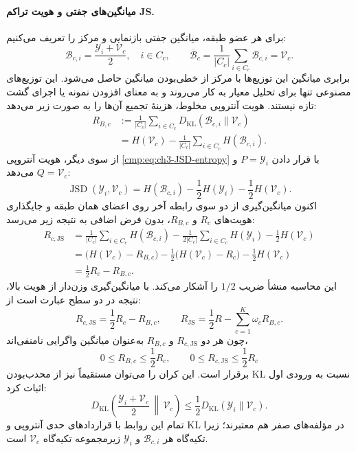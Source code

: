 \paragraph{میانگین‌های جفتی و هویت تراکم JS.}
برای هر عضو طبقه، میانگین جفتی بازنمایی و مرکز را تعریف می‌کنیم:
\begin{equation}\label{cmp:eq:ch3-R-JS-midpoint-distributions}
\boxed{
\mathscr B_{c,i}
=\frac{\mathscr Y_i+\mathcal V_c}{2},
\quad i\in C_c,
\qquad
\overline{\mathscr B}_c
=\frac1{|C_c|}\sum_{i\in C_c}\mathscr B_{c,i}
=\mathcal V_c.
}
\end{equation}
برابری میانگین این توزیع‌ها با مرکز از خطی‌بودن
میانگین حاصل می‌شود. این توزیع‌های مصنوعی تنها
برای تحلیل معیار به کار می‌روند و به معنای
افزودن نمونه یا اجرای گشت تازه نیستند.
هویت آنتروپی مخلوط، هزینهٔ تجمیع آن‌ها را
به صورت زیر می‌دهد:
\begin{equation}\label{cmp:eq:ch3-R-midpoint-KL}
\boxed{
\begin{aligned}
R_{B,c}
&:=\frac1{|C_c|}\sum_{i\in C_c}
D_{\mathrm{KL}}(\mathscr B_{c,i}\|\mathcal V_c)\\
&=H(\mathcal V_c)
-\frac1{|C_c|}\sum_{i\in C_c}H(\mathscr B_{c,i}).
\end{aligned}}
\end{equation}
از سوی دیگر، هویت آنتروپی
\eqref{cmp:eq:ch3-JSD-entropy}
با قرار دادن $P=\mathscr Y_i$ و
$Q=\mathcal V_c$ می‌دهد:
\[
\operatorname{JSD}(\mathscr Y_i,\mathcal V_c)
=H(\mathscr B_{c,i})
-\frac12H(\mathscr Y_i)
-\frac12H(\mathcal V_c).
\]
اکنون میانگین‌گیری از دو سوی
رابطه آخر روی اعضای همان طبقه
و جایگذاری هویت‌های $R_c$ و $R_{B,c}$،
بدون فرض اضافی به نتیجه زیر می‌رسد:
\begin{equation}\label{eq:app-ch3-R-JS-midpoint-proof}
\begin{aligned}
R_{c,\mathrm{JS}}
&=\frac1{|C_c|}\sum_{i\in C_c}H(\mathscr B_{c,i})
-\frac1{2|C_c|}\sum_{i\in C_c}H(\mathscr Y_i)
-\frac12H(\mathcal V_c)\\
&=\bigl(H(\mathcal V_c)-R_{B,c}\bigr)
-\frac12\bigl(H(\mathcal V_c)-R_c\bigr)
-\frac12H(\mathcal V_c)\\
&=\frac12R_c-R_{B,c}.
\end{aligned}
\end{equation}
این محاسبه منشأ ضریب $1/2$ را آشکار
می‌کند. با میانگین‌گیری وزن‌دار از هویت بالا، نتیجه در دو سطح عبارت است از:
\begin{equation}\label{cmp:eq:ch3-R-JS-KL-midpoint-identity}
\boxed{
R_{c,\mathrm{JS}}
=\frac12R_c-R_{B,c},
\qquad
R_{\mathrm{JS}}
=\frac12R-\sum_{c=1}^{K}\omega_cR_{B,c}.
}
\end{equation} چون هر دو
$R_{c,\mathrm{JS}}$ و $R_{B,c}$
به‌عنوان میانگین واگرایی نامنفی‌اند،
\[
0\le R_{B,c}\le\frac12R_c,\qquad
0\le R_{c,\mathrm{JS}}\le\frac12R_c
\]
برقرار است. این کران را می‌توان
مستقیماً نیز از محدب‌بودن KL
نسبت به ورودی اول اثبات کرد:
\[
D_{\mathrm{KL}}\!\left(
\frac{\mathscr Y_i+\mathcal V_c}{2}
\,\middle\|\,\mathcal V_c\right)
\le\frac12
D_{\mathrm{KL}}(\mathscr Y_i\|\mathcal V_c).
\]
تمام این روابط با قراردادهای حدی
آنتروپی و KL در مؤلفه‌های صفر
هم معتبرند؛ زیرا تکیه‌گاه هر
$\mathscr B_{c,i}$ و $\mathscr Y_i$
زیرمجموعه تکیه‌گاه $\mathcal V_c$
است.


